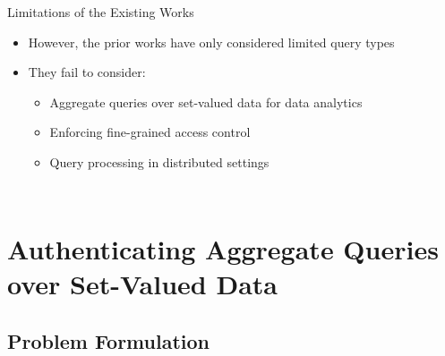 \documentclass[xcolor={dvipsnames},aspectratio=169,10pt]{beamer}
\begin{document}
\begin{frame}{Limitations of the Existing Works}
  \begin{itemize}[<+->]
    \item However, the prior works have only considered \alert{limited query types}
    \item They fail to consider:
      \begin{itemize}[<+- | alert@+>]
        \item Aggregate queries over set-valued data for data analytics
        \item Enforcing fine-grained access control
        \item Query processing in distributed settings
      \end{itemize}
  \end{itemize}

  \begin{columns}[b,onlytextwidth]
    \begin{column}{0.33\linewidth}
      \begin{figure}
      \end{figure}
    \end{column}
    \begin{column}{0.33\linewidth}
      \begin{figure}
      \end{figure}
    \end{column}
    \begin{column}{0.33\linewidth}
      \begin{figure}
      \end{figure}
    \end{column}
  \end{columns}
\end{frame}

\section{Authenticating Aggregate Queries over Set-Valued Data}

\subsection{Problem Formulation}
\end{document}

